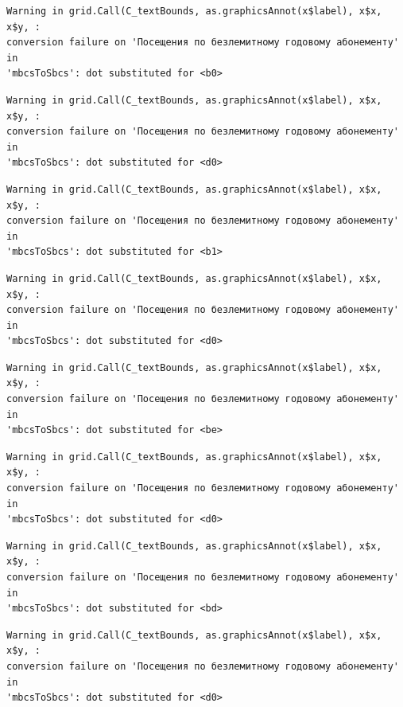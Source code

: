 \documentclass[
  letterpaper,
  DIV=11,
  numbers=noendperiod]{scrartcl}
\begin{document}
\begin{verbatim}
Warning in grid.Call(C_textBounds, as.graphicsAnnot(x$label), x$x, x$y, :
conversion failure on 'Посещения по безлемитному годовому абонементу' in
'mbcsToSbcs': dot substituted for <b0>
\end{verbatim}

\begin{verbatim}
Warning in grid.Call(C_textBounds, as.graphicsAnnot(x$label), x$x, x$y, :
conversion failure on 'Посещения по безлемитному годовому абонементу' in
'mbcsToSbcs': dot substituted for <d0>
\end{verbatim}

\begin{verbatim}
Warning in grid.Call(C_textBounds, as.graphicsAnnot(x$label), x$x, x$y, :
conversion failure on 'Посещения по безлемитному годовому абонементу' in
'mbcsToSbcs': dot substituted for <b1>
\end{verbatim}

\begin{verbatim}
Warning in grid.Call(C_textBounds, as.graphicsAnnot(x$label), x$x, x$y, :
conversion failure on 'Посещения по безлемитному годовому абонементу' in
'mbcsToSbcs': dot substituted for <d0>
\end{verbatim}

\begin{verbatim}
Warning in grid.Call(C_textBounds, as.graphicsAnnot(x$label), x$x, x$y, :
conversion failure on 'Посещения по безлемитному годовому абонементу' in
'mbcsToSbcs': dot substituted for <be>
\end{verbatim}

\begin{verbatim}
Warning in grid.Call(C_textBounds, as.graphicsAnnot(x$label), x$x, x$y, :
conversion failure on 'Посещения по безлемитному годовому абонементу' in
'mbcsToSbcs': dot substituted for <d0>
\end{verbatim}

\begin{verbatim}
Warning in grid.Call(C_textBounds, as.graphicsAnnot(x$label), x$x, x$y, :
conversion failure on 'Посещения по безлемитному годовому абонементу' in
'mbcsToSbcs': dot substituted for <bd>
\end{verbatim}

\begin{verbatim}
Warning in grid.Call(C_textBounds, as.graphicsAnnot(x$label), x$x, x$y, :
conversion failure on 'Посещения по безлемитному годовому абонементу' in
'mbcsToSbcs': dot substituted for <d0>
\end{verbatim}
\end{document}
